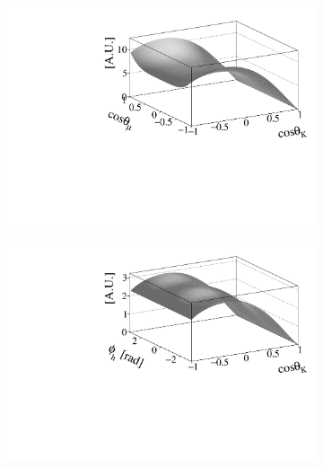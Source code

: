 \begin{figure}[t]
  \centering
  \begin{subfigure}{0.5\textwidth}
    \raggedright
    \includegraphics[width=\textwidth]{Figures/Chapter4/canv_cosThK_cosThL_Sim08_3fb_hel_negKaons_all.pdf}
    \caption{}
    \label{eff2D_kl}
  \end{subfigure}%
  \hfill%
  \begin{subfigure}{0.5\textwidth}
    \raggedleft
    \includegraphics[width=\textwidth]{Figures/Chapter4/canv_cosThK_phi_Sim08_3fb_hel_negKaons_all.pdf}
    \caption{}
    \label{eff2D_kp}
  \end{subfigure}
  \begin{subfigure}{0.5\textwidth}
    \raggedright

\end{subfigure}
\end{figure}
